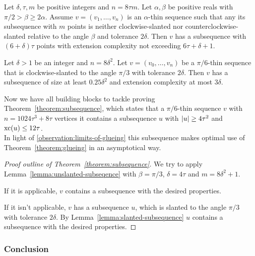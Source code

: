 \begin{lemma}\label{lemma:unslanted-subseqence}
  Let $\delta, \tau, m$ be positive integers and $n=8\tau m$. Let $\alpha,\beta$ be positive reals with $\pi/2>\beta\geqslant 2\alpha$. Assume $v=(v_1,\ldots,v_n)$ is an $\alpha$-thin sequence such that any its subsequence with $m$ points is neither clockwise-slanted nor counterclockwise-slanted relative to the angle $\beta$ and tolerance $2\delta$. Then $v$ has a subsequence with $(6+\delta)\tau$ points with extension complexity not exceeding $6\tau+\delta+1$.
\end{lemma}

\begin{lemma}\label{lemma:slanted-subsequence}
  Let $\delta>1$ be an integer and $n=8\delta^2$. Let $v=(v_0,\ldots,v_n)$ be a $\pi/6$-thin sequence that is clockwise-slanted to the angle $\pi/3$ with tolerance $2\delta$. Then $v$ has a subsequence of size at least $0.25\delta^2$ and extension complexity at most $3\delta$.
\end{lemma}

Now we have all building blocks to tackle proving Theorem~\ref{theorem:subsequence}, which states that a $\pi/6$-thin sequence $v$ with $n = 1024\tau^3 + 8\tau$ vertices it contains a subsequence $u$ with $\lvert u\rvert \geq 4\tau^2$ and $\operatorname{xc}(u) \leq 12\tau$.\\
In light of \ref{observation:limits-of-glueing} this subsequence makes optimal use of Theorem~\ref{theorem:glueing} in an asymptotical way.

\begin{proof}[Proof outline of Theorem~\ref{theorem:subsequence}]
  We try to apply Lemma~\ref{lemma:unslanted-subseqence} with $\beta = \pi/3$, $\delta = 4\tau$ and $m = 8\delta^2 + 1$.

  If it is applicable, $v$ contains a subsequence with the desired properties.

  If it isn't applicable, $v$ has a subsequence $u$, which is slanted to the angle $\pi/3$ with tolerance $2\delta$. By Lemma~\ref{lemma:slanted-subsequence} $u$ contains a subsequence with the desired properties.
\end{proof}



\subsubsection{Conclusion}

